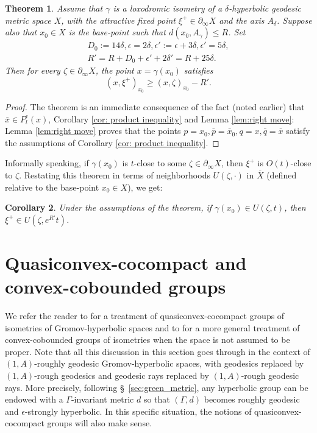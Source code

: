 \documentclass[12pt]{amsbook}%
\newtheorem{thm}{Theorem}[chapter]
\newtheorem{cor}[thm]{Corollary}
\theoremstyle{definition}
\theoremstyle{remark}
\numberwithin{section}{chapter}
\numberwithin{subsection}{section}
\numberwithin{figure}{chapter}
\def\eps{\epsilon}
\def\ga{\gamma}
\def\geo{\partial_\infty}
\def\ol{\overline}
\def\kap{}
\begin{document}
\begin{thm}\label{thm:fixed-point-estimate}
Assume that $\ga$ is a loxodromic isometry of a $\delta$-hyperbolic geodesic metric space $X$, 
with the attractive  fixed point $\xi^+\in \geo X$ and the axis $A_\delta$. Suppose also 
that $x_0\in X$ is the base-point such that $d(x_0, A_\ga)\leqslant R$. Set
\begin{align*}
D_0:=14\delta, \eps=2\delta, \eps':=\eps+ 3\delta, \eps'=5\delta, \\ 
R'=  R+D_0+\eps' + 2\delta' = 
R+ 25\delta. 
\end{align*}
Then for every $\zeta\in \geo X$, the point $x=\ga(x_0)$ satisfies 
$$
(x,\xi^+)_{x_0} \geqslant (x,\zeta)_{x_0} - R'.
$$
\end{thm}
\begin{proof} The theorem is an immediate consequence of the fact (noted earlier) that $\bar{x}\in P_l^\eps(x)$, Corollary \ref{cor: product inequality} and 
Lemma \ref{lem:right move}: Lemma \ref{lem:right move} proves that the points $p=x_0, \bar{p}=\bar{x}_0, q=x, \bar{q}=\bar{x}$ satisfy the assumptions of  
Corollary \ref{cor: product inequality}. 
\end{proof}

Informally speaking, if $\ga(x_0)$ is $t$-close to some $\zeta\in \geo X$, then $\xi^+$ is $O(t)$-close to 
$\zeta$. Restating this theorem in terms of neighborhoods $U(\zeta, \cdot)$ in $\ol{X}$ (defined relative to the base-point $x_0\in X$), 
we get:

\begin{cor}\label{cor:fixed-point-estimate}
Under the assumptions of the theorem, if $\ga(x_0)\in U(\zeta, t)$, then $\xi^+\in U(\zeta, e^{R'}t)$. 
\end{cor}









\section{Quasiconvex-cocompact and convex-cobounded groups} \label{sec:quasiconvex}




We refer the reader to \cite{Coo93} for a  treatment of quasiconvex-cocompact groups of isometries of Gromov-hyperbolic spaces and to {\cite[Definition 12.2.5]{DSU}} for a more general treatment of convex-cobounded groups of isometries { when the space is not assumed to be proper}.  Note that all this discussion in this section goes through in the context of $(1,A)$-roughly geodesic Gromov-hyperbolic spaces, with geodesics replaced by $(1,A)$-rough geodesics and geodesic rays replaced by $(1,A)$-rough geodesic rays. 
More precisely, following \S~\ref{sec:green_metric}, any hyperbolic group can be endowed with a $\Gamma$-invariant metric $d$ so that $(\Gamma,d)$ becomes roughly geodesic and $\epsilon$-strongly hyperbolic. In this specific situation, the notions of quasiconvex-cocompact groups will also make sense. 
\end{document}
